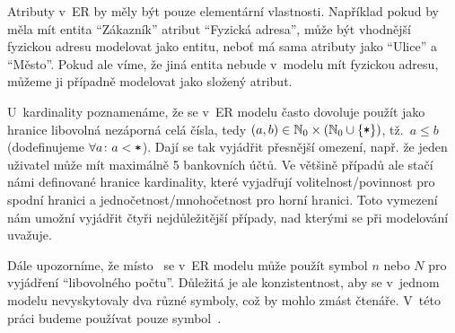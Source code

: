 Atributy v~ER by měly být pouze elementární vlastnosti.
Například pokud by měla mít entita \enquote{Zákazník} atribut \enquote{Fyzická adresa}, může být vhodnější fyzickou adresu modelovat jako entitu, neboť má sama atributy jako \enquote{Ulice} a \enquote{Město}.
Pokud ale víme, že jiná entita nebude v~modelu mít fyzickou adresu, můžeme ji případně modelovat jako složený atribut.

U~kardinality poznamenáme, že se v~ER modelu často dovoluje použít jako hranice libovolná nezáporná celá čísla, tedy $(a, b)\in \mathbb N_0\times \left(\mathbb N_0 \cup \left\{\texttt{*}\right\}\right)$, tž.~$a\leq b$ (dodefinujeme $\forall a\colon a < \texttt{*}$).
Dají se tak vyjádřit přesnější omezení, např. že jeden uživatel může mít maximálně 5 bankovních účtů.
Ve většině případů ale stačí námi definované hranice kardinality, které vyjadřují volitelnost/povinnost pro spodní hranici a jednočetnost/mnohočetnost pro horní hranici.
Toto vymezení nám umožní vyjádřit čtyři nejdůležitější případy, nad kterými se při modelování uvažuje.

Dále upozorníme, že místo~\many{} se v~ER modelu může použít symbol $n$ nebo $N$ pro vyjádření \enquote{libovolného počtu}.
Důležitá je ale konzistentnost, aby se v~jednom modelu nevyskytovaly dva různé symboly, což by mohlo zmást čtenáře.
V~této práci budeme používat pouze symbol~\many{}.

